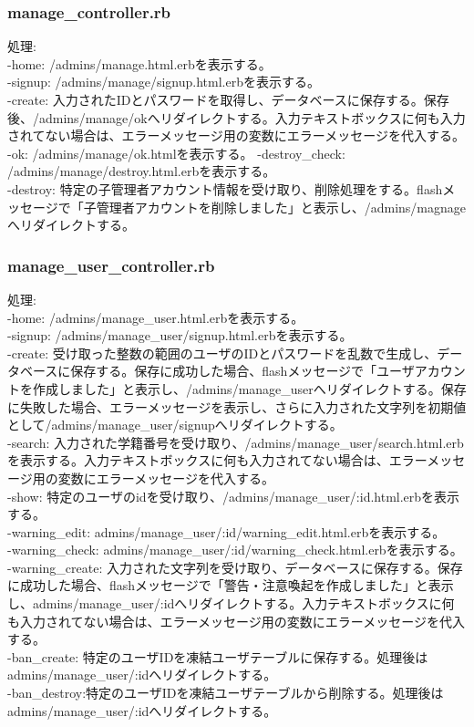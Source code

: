 \documentclass[a4j]{jarticle}
\begin{document}
\subsubsection{manage\_controller.rb}
\noindent
処理:  \\
-home: /admins/manage.html.erbを表示する。\\
-signup: /admins/manage/signup.html.erbを表示する。\\
-create: 入力されたIDとパスワードを取得し、データベースに保存する。保存後、/admins/manage/okへリダイレクトする。入力テキストボックスに何も入力されてない場合は、エラーメッセージ用の変数にエラーメッセージを代入する。\\
-ok: /admins/manage/ok.htmlを表示する。
-destroy\_check: /admins/manage/destroy.html.erbを表示する。\\
-destroy: 特定の子管理者アカウント情報を受け取り、削除処理をする。flashメッセージで「子管理者アカウントを削除しました」と表示し、/admins/magnageへリダイレクトする。

\subsubsection{manage\_user\_controller.rb}
\noindent
処理:  \\
-home: /admins/manage\_user.html.erbを表示する。\\
-signup: /admins/manage\_user/signup.html.erbを表示する。\\
-create: 受け取った整数の範囲のユーザのIDとパスワードを乱数で生成し、データベースに保存する。保存に成功した場合、flashメッセージで「ユーザアカウントを作成しました」と表示し、/admins/manage\_userへリダイレクトする。保存に失敗した場合、エラーメッセージを表示し、さらに入力された文字列を初期値として/admins/manage\_user/signupへリダイレクトする。\\
-search: 入力された学籍番号を受け取り、/admins/manage\_user/search.html.erbを表示する。入力テキストボックスに何も入力されてない場合は、エラーメッセージ用の変数にエラーメッセージを代入する。\\
-show: 特定のユーザのidを受け取り、/admins/manage\_user/:id.html.erbを表示する。\\
-warning\_edit: admins/manage\_user/:id/warning\_edit.html.erbを表示する。\\
-warning\_check: admins/manage\_user/:id/warning\_check.html.erbを表示する。\\
-warning\_create: 入力された文字列を受け取り、データベースに保存する。保存に成功した場合、flashメッセージで「警告・注意喚起を作成しました」と表示し、admins/manage\_user/:idへリダイレクトする。入力テキストボックスに何も入力されてない場合は、エラーメッセージ用の変数にエラーメッセージを代入する。\\
-ban\_create: 特定のユーザIDを凍結ユーザテーブルに保存する。処理後はadmins/manage\_user/:idへリダイレクトする。\\
-ban\_destroy:特定のユーザIDを凍結ユーザテーブルから削除する。処理後はadmins/manage\_user/:idへリダイレクトする。
\end{document}
